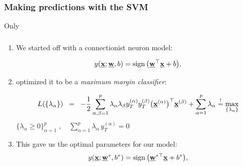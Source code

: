 \subsubsection{Making predictions with the SVM}

\begin{frame}{Only}\frametitle{\subsubsecname}

\begin{enumerate}
\item<only@1> We started off with a connectionist neuron model:

\begin{equation}
y(\underline{\mathbf{x}}; \underline{\mathbf{w}}, b) = 
			\operatorname{sign} \big( \underline{\mathbf{w}}^\top \underline{\mathbf{x}} + b \big),
\end{equation}

\item<only@1> optimized it to be a \emph{maximum margin classifier}:

			\begin{equation} 
				L(\{\lambda_\alpha\})
					\;\;=\;\;  -\frac{1}{2} \sum\limits_{\alpha, \beta = 1}^p 
					\lambda_\alpha \lambda_\beta y_T^{(\alpha)}
					y_T^{(\beta)} 
					\big( \underline{\mathbf{x}}^{(\alpha)} \big)^\top 
						\underline{\mathbf{x}}^{(\beta)}
					+ \sum\limits_{\alpha = 1}^p \lambda_\alpha{}
                    \stackrel{\mathrm{!}}{=} \max_{\{\lambda_\alpha\}}
			\end{equation}	
			$\{\lambda_\alpha \geq 0 \}_{\alpha=1}^p\;,\quad 
			\sum_{\alpha=1}^p \lambda_\alpha \, y_T^{(\alpha)} = 0$	
			
\item<only@2,3> This gave us the optimal parameters for our model:
\begin{equation}
y(\underline{\mathbf{x}}; \underline{\mathbf{w}}^*, b^*) = 
			\operatorname{sign} \big( \underline{\mathbf{w}}^{*\top} \underline{\mathbf{x}} + b^* \big),
\end{equation}

\end{enumerate}

\end{frame}
